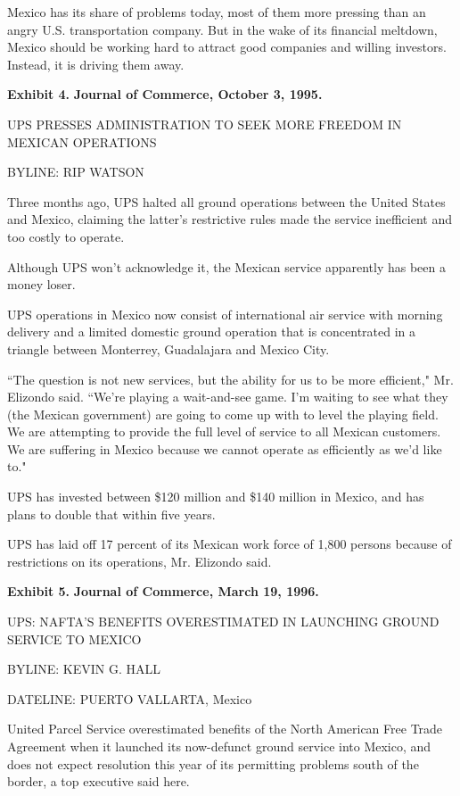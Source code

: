 \documentclass[letterpaper,12pt]{article}
\begin{document}
Mexico has its share of problems today, most of them more pressing
than an angry U.S. transportation company. But in the wake of its
financial meltdown, Mexico should be working hard to attract good
companies and willing investors. Instead, it is driving them away.



\newpage
{\bf Exhibit 4.} {\bf Journal of Commerce, October 3, 1995.}

UPS PRESSES ADMINISTRATION TO SEEK MORE FREEDOM IN MEXICAN
OPERATIONS

BYLINE: RIP WATSON

Three months ago, UPS halted all ground operations between the
United States and Mexico, claiming the latter's restrictive rules
made the service inefficient and too costly to operate.

Although UPS won't acknowledge it, the Mexican service apparently
has been a money loser.

UPS operations in Mexico now consist of international air service
with morning delivery and a limited domestic ground operation that
is concentrated in a triangle between Monterrey, Guadalajara and
Mexico City.

``The question is not new services, but the ability for us to be
more efficient," Mr. Elizondo said. ``We're playing a wait-and-see
game. I'm waiting to see what they (the Mexican government) are
going to come up with to level the playing field. We are attempting
to provide the full level of service to all Mexican customers. We
are suffering in Mexico because we cannot operate as efficiently as
we'd like to."

UPS has invested between \$120 million and \$140 million in Mexico,
and has plans to double that within five years.

UPS has laid off 17 percent of its Mexican work force of 1,800
persons because of restrictions on its operations, Mr. Elizondo
said.



\newpage
{\bf Exhibit 5.} {\bf Journal of Commerce, March 19, 1996.}

UPS: NAFTA'S BENEFITS OVERESTIMATED IN LAUNCHING GROUND SERVICE TO
MEXICO

BYLINE: KEVIN G. HALL

DATELINE: PUERTO VALLARTA, Mexico

United Parcel Service overestimated benefits of the North American
Free Trade Agreement when it launched its now-defunct ground service
into Mexico, and does not expect resolution this year of its
permitting problems south of the border, a top executive said here.
\end{document}
